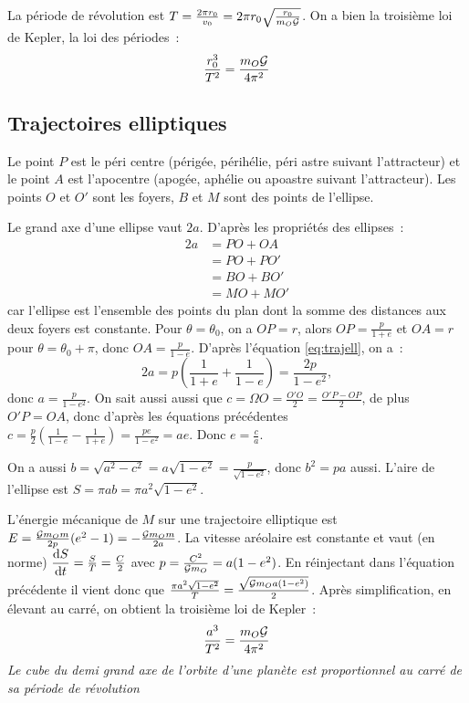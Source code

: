 La période de révolution est \(T = \frac{2\pi r_0}{v_0} = 2\pi r_0 
\sqrt{\frac{r_0}{m_O \mathcal{G}}}\). On a bien la troisième loi de Kepler, la loi des 
%
périodes~:
\begin{equation}%
  \frac{r_0^3}{T^2} = \frac{m_O \Gb}{4\pi^2}
\end{equation}%

\subsection{Trajectoires elliptiques}%
Le point \(P\) est le péri centre (périgée, périhélie, péri astre suivant 
l'attracteur) et le point \(A\) est l'apocentre (apogée, aphélie ou apoastre 
suivant l'attracteur). Les points \(O\) et \(O'\) sont les foyers, \(B\) et 
\(M\) sont des points de l'ellipse.

Le grand axe d'une ellipse vaut \(2a\). D'après les propriétés des ellipses~:
\begin{equation}\label{eq:trajell}%
\begin{split}%
  2a & = PO + OA \\
  & = PO + PO' \\
  & = BO + BO' \\
  & = MO + MO'
\end{split}%
\end{equation}%
car l'ellipse est l'ensemble des points du plan dont la somme des distances aux 
deux foyers est constante.
Pour \(\theta = \theta_0\), on a \(OP=r\), alors \(OP = \frac{p}{1+e}\) et \(OA 
= r\) pour \(\theta = \theta_0 + \pi\), donc \(OA = \frac{p}{1-e}\).
D'après l'équation \eqref{eq:trajell}, on a~:
\[2a = p\left(\frac{1}{1+e} + \frac{1}{1-e}\right) = \frac{2p}{1-e^2},\]
donc \(a = \frac{p}{1-e^2}\).
On sait aussi aussi que \(c = \Omega O = \frac{O'O}{2} = \frac{O'P - OP}{2}\), 
de plus \(O'P = OA\), donc d'après les équations précédentes \(c= 
\frac{p}{2}\left(\frac{1}{1-e} - \frac{1}{1+e}\right) = \frac{pe}{1-e^2} = %
ae\). Donc \(e = \frac{c}{a}\).

On a aussi \(b = \sqrt{a^2 - c^2} = a\sqrt{1-e^2} = \frac{p}{\sqrt{1-e^2}}\), 
donc \(b^2 = pa\) aussi. L'aire de l'ellipse est \(S = \pi ab = \pi 
a^2\sqrt{1-e^2}\).

L'énergie mécanique de \(M\) sur une trajectoire elliptique est \(E = \frac{\mathcal{G} 
m_O m}{2p}(e^2-1) = -\frac{\mathcal{G} m_O m}{2a}\). La vitesse aréolaire est constante 
et vaut (en norme) \(\dfrac{\mathrm{d} S}{\mathrm{d} t} = \frac{S}{T} = \frac{C}{2}\) avec \(p = 
\frac{C^2}{\mathcal{G} m_O} = a(1-e^2)\). En réinjectant dans l'équation précédente il 
%
vient donc que \(\frac{\pi a^2\sqrt{1-e^2}}{T} = \frac{\sqrt{\mathcal{G} m_O 
a(1-e^2)}}{2}\). Après simplification, en élevant au carré, on obtient la 
troisième loi de Kepler~:
\begin{equation}\label{eq:troisieme-loi-kepler}%
  \frac{a^3}{T^2} = \frac{m_O \Gb}{4\pi^2}
\end{equation}%
\emph{Le cube du demi grand axe de l'orbite d'une planète est proportionnel au 
carré de sa période de révolution}


